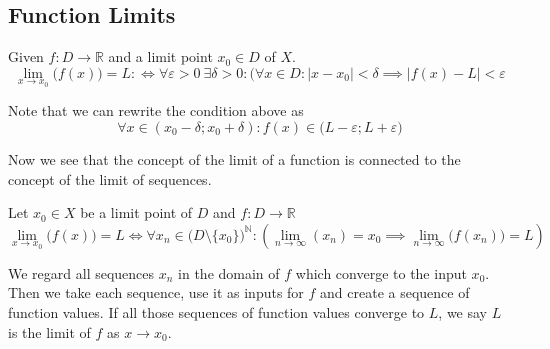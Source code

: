 \subsection{Function Limits}\label{ssec:function_limits}
\begin{definition}\label{def:func_limit}
   Given \(f: D \to \mathbb{R}\) and a limit point \(x_0 \in D\) of \(X\).
   \[\lim_{x \to x_0}\big(f(x)\big) = L :\iff \forall \varepsilon > 0~\exists \delta > 0: (\forall x \in D: \lvert x - x_0 \rvert < \delta \implies \lvert f(x) - L\rvert < \varepsilon\]
\end{definition}
\begin{remark}[Intuition]
   Note that we can rewrite the condition above as
   \[\forall x \in (x_0 - \delta; x_0 + \delta): f(x) \in \big(L - \varepsilon; L + \varepsilon\big)\]
   \begin{center}
      
   \end{center}
\end{remark}
Now we see that the concept of the limit of a function is connected to the concept of the limit of sequences.
\begin{proposition}[Function Limit = Sequence Limit]
   Let \(x_0 \in X\) be a limit point of \(D\) and \(f: D \to \mathbb{R}\)
   \[\lim_{x \to x_0}\big(f(x)\big) = L \iff \forall x_n \in \big(D\setminus\{x_0\}\big)^\mathbb{N}: \left(\lim_{n \to \infty}(x_n) = x_0 \implies  \lim_{n \to \infty}\big(f(x_n)\big) = L\right)\]
\end{proposition}
\begin{remark}[Intuition]
   We regard all sequences \(x_n\) in the domain of \(f\) which converge to the input \(x_0\).
   Then we take each sequence, use it as inputs for \(f\) and create a sequence of function values.
   If all those sequences of function values converge to \(L\), we say \(L\) is the limit of \(f\) as \(x \to x_0\).
\end{remark}

